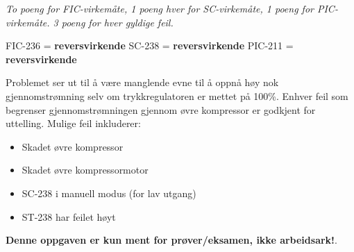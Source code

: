 




{\it To poeng for FIC-virkemåte, 1 poeng hver for SC-virkemåte, 1 poeng for PIC-virkemåte. 3 poeng for hver gyldige feil.}

\vskip 10pt

FIC-236 = {\bf reversvirkende} \hskip 50pt SC-238 = {\bf reversvirkende} \hskip 50pt PIC-211 = {\bf reversvirkende}

\vskip 10pt

Problemet ser ut til å være manglende evne til å oppnå høy nok gjennomstrømning selv om trykkregulatoren er mettet på 100\%.  Enhver feil som begrenser gjennomstrømningen gjennom øvre kompressor er godkjent for uttelling.  Mulige feil inkluderer:

\begin{itemize}
\item{} Skadet øvre kompressor
\item{} Skadet øvre kompressormotor
\item{} SC-238 i manuell modus (for lav utgang)
\item{} ST-238 har feilet høyt
\end{itemize}







{\bf Denne oppgaven er kun ment for prøver/eksamen, ikke arbeidsark!}.

